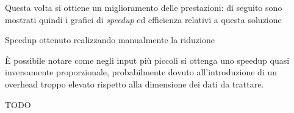 Questa volta si ottiene un miglioramento delle prestazioni: di seguito sono mostrati quindi i grafici di \emph{speedup} ed efficienza relativi a questa soluzione

\begin{plot}
    \caption{Speedup ottenuto realizzando manualmente la riduzione}
\end{plot}

È possibile notare come negli input più piccoli si ottenga uno speedup quasi inversamente proporzionale, probabilmente dovuto all'introduzione di un overhead troppo elevato rispetto alla dimensione dei dati da trattare.


\begin{plot}
    \caption{TODO}
    \label{fig:comparison}
\end{plot}
